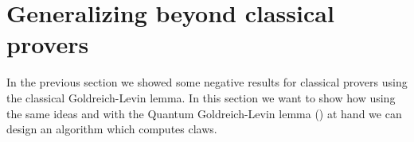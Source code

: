 \documentclass{article}
\newtheorem{remark}{Remark}
\begin{document}
\section{Generalizing beyond classical provers} In the previous section we showed some negative results for classical provers using the classical Goldreich-Levin lemma. In this section we want to show how using the same ideas and with the Quantum Goldreich-Levin lemma (\cite{qgllemma}) at hand we can design an algorithm which computes claws.
\end{document}
